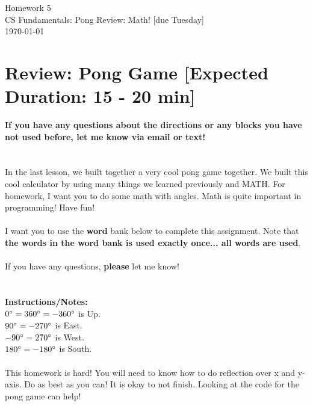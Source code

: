 \documentclass[11pt]{article}
\newcommand{\myhwname}{Homework 5}
\newcommand{\mysection}{CS Fundamentals: Pong Review: Math! [due Tuesday]}
\begin{document}
\begin{center}
    {\Large \myhwname} \\
    \mysection \\
    \today
\end{center}

\section{Review: Pong Game [Expected Duration: 15 - 20 min]}
\textbf{If you have any questions about the directions or any blocks you have not used before, let me know via email or text!}\\\\
\noindent\makebox[\linewidth]{\rule{\paperwidth}{0.4pt}}\\
In the last lesson, we built together a very cool pong game together. 
We built this cool calculator by using many things we learned previously and MATH. 
For homework, I want you to do some math with angles. Math is quite important in programming! Have fun!\\\\ 
I want you to use the \textbf{word} bank below to complete this assignment. 
Note that \textbf{the words in the word bank is used exactly once... all words are used}.\\\\
If you have any questions, \textbf{please} let me know!\\\\
\noindent\makebox[\linewidth]{\rule{\paperwidth}{0.4pt}}\\
\textbf{Instructions/Notes:}\\
$0\degree = 360\degree = -360\degree$ is Up.\\
$90\degree = -270 \degree$ is East.\\
$-90\degree = 270 \degree$ is West.\\
$180\degree = -180\degree$ is South.\\\\
This homework is hard! You will need to know how to do reflection over x and y-axis. Do as best as you can! It is okay to not finish. Looking at the code for the pong game can help!
\\
\noindent\makebox[\linewidth]{\rule{\paperwidth}{0.4pt}}
\end{document}
